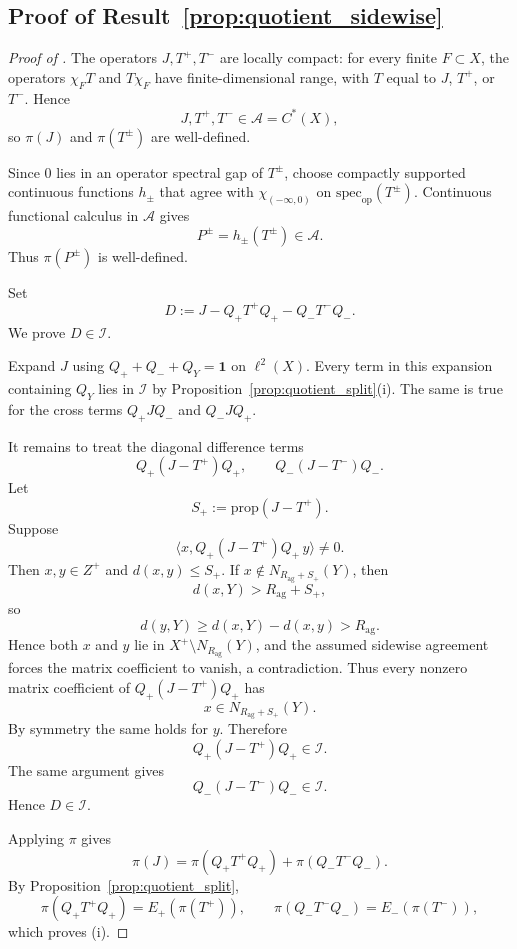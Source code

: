 \documentclass[11pt]{article}
\numberwithin{equation}{section}
\theoremstyle{definition}
\theoremstyle{remark}
\newcommand{\Id}{\mathbf{1}}
\newcommand{\spec}{\mathrm{spec}}
\begin{document}
\subsection{Proof of Result~\ref{prop:quotient_sidewise}}\label{app:proof:prop:quotient_sidewise}
\begin{proof}[Proof of ]
The operators \(J,T^+,T^-\) are locally compact: for every finite \(F\subset X\), the operators
\(\chi_FT\) and \(T\chi_F\) have finite-dimensional range, with \(T\) equal to \(J\), \(T^+\), or
\(T^-\). Hence
\[
J,T^+,T^-\in\mathcal A=C^*(X),
\]
so $\pi(J)$ and $\pi(T^\pm)$ are well-defined.

Since $0$ lies in an operator spectral gap of $T^\pm$, choose compactly supported continuous
functions $h_\pm$ that agree with $\chi_{(-\infty,0)}$ on $\spec_{\mathrm{op}}(T^\pm)$. Continuous
functional calculus in $\mathcal A$ gives
\[
P^\pm=h_\pm(T^\pm)\in\mathcal A.
\]
Thus $\pi(P^\pm)$ is well-defined.

Set
\[
D:=J-Q_+T^+Q_+-Q_-T^-Q_-.
\]
We prove $D\in\mathcal I$.

Expand $J$ using $Q_++Q_-+Q_Y=\Id$ on $\ell^2(X)$. Every term in this expansion containing
$Q_Y$ lies in $\mathcal I$ by Proposition~\ref{prop:quotient_split}(i). The same is true for the
cross terms $Q_+JQ_-$ and $Q_-JQ_+$.

It remains to treat the diagonal difference terms
\[
Q_+(J-T^+)Q_+,
\qquad
Q_-(J-T^-)Q_-.
\]
Let
\[
S_+:=\mathrm{prop}(J-T^+).
\]
Suppose
\[
\langle x,Q_+(J-T^+)Q_+\,y\rangle\neq0.
\]
Then $x,y\in Z^+$ and $d(x,y)\le S_+$. If $x\notin N_{R_{\mathrm{ag}}+S_+}(Y)$, then
\[
d(x,Y)>R_{\mathrm{ag}}+S_+,
\]
so
\[
d(y,Y)\ge d(x,Y)-d(x,y)>R_{\mathrm{ag}}.
\]
Hence both $x$ and $y$ lie in $X^+\setminus N_{R_{\mathrm{ag}}}(Y)$, and the assumed sidewise
agreement forces the matrix coefficient to vanish, a contradiction. Thus every nonzero matrix
coefficient of $Q_+(J-T^+)Q_+$ has
\[
x\in N_{R_{\mathrm{ag}}+S_+}(Y).
\]
By symmetry the same holds for $y$. Therefore
\[
Q_+(J-T^+)Q_+\in\mathcal I.
\]
The same argument gives
\[
Q_-(J-T^-)Q_-\in\mathcal I.
\]
Hence $D\in\mathcal I$.

Applying $\pi$ gives
\[
\pi(J)=\pi(Q_+T^+Q_+)+\pi(Q_-T^-Q_-).
\]
By Proposition~\ref{prop:quotient_split},
\[
\pi(Q_+T^+Q_+)=E_+(\pi(T^+)),
\qquad
\pi(Q_-T^-Q_-)=E_-(\pi(T^-)),
\]
which proves (i).


\end{proof}
\end{document}
